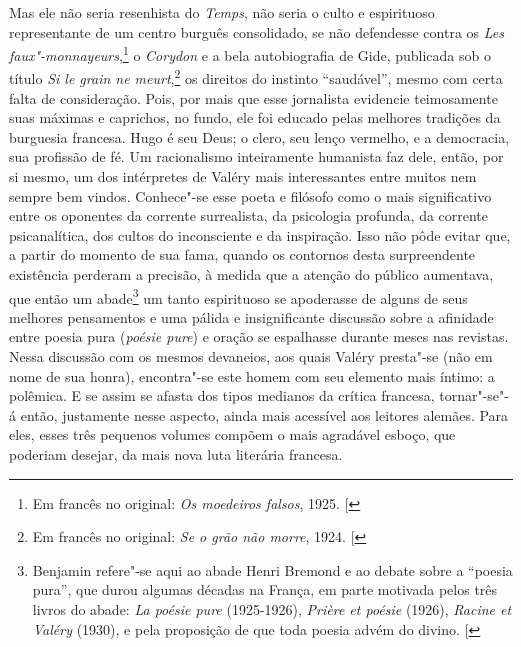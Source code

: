 Mas ele não seria resenhista do \emph{Temps}, não seria o culto e
espirituoso representante de um centro burguês consolidado, se não
defendesse contra os \emph{Les faux"-monnayeurs},\footnote{Em francês no original: \emph{Os moedeiros falsos}, 1925. {[}\versal{N. T.}{]}} o \emph{Corydon} e a bela
autobiografia de Gide, publicada sob o título \emph{Si le grain ne meurt},\footnote{Em francês no original: \emph{Se o grão não
morre}, 1924. {[}\versal{N. T.}{]}} os direitos do instinto ``saudável'', mesmo com certa falta de
consideração. Pois, por mais que esse jornalista evidencie teimosamente
suas máximas e caprichos, no fundo, ele foi educado pelas melhores
tradições da burguesia francesa. Hugo é seu Deus; o clero, seu lenço
vermelho, e a democracia, sua profissão de fé. Um racionalismo
inteiramente humanista faz dele, então, por si mesmo, um dos intérpretes
de Valéry mais interessantes entre muitos nem sempre bem vindos.
Conhece"-se esse poeta e filósofo como o mais significativo entre os
oponentes da corrente surrealista, da psicologia profunda, da corrente
psicanalítica, dos cultos do inconsciente e da inspiração. Isso não pôde
evitar que, a partir do momento de sua fama, quando os contornos desta
surpreendente existência perderam a precisão, à medida que a atenção do
público aumentava, que então um abade\footnote{Benjamin refere"-se aqui
  ao abade Henri Bremond e ao debate sobre a ``poesia pura'', que durou
  algumas décadas na França, em parte motivada pelos três livros do
  abade: \emph{La poésie pure} (1925-1926), \emph{Prière et poésie}
  (1926), \emph{Racine et Valéry} (1930), e pela proposição de que toda
  poesia advém do divino. {[}\versal{N. E.}{]}} um tanto espirituoso se
apoderasse de alguns de seus melhores pensamentos e uma pálida e
insignificante discussão sobre a afinidade entre poesia pura
(\emph{poésie pure}) e oração se espalhasse durante meses nas revistas.
Nessa discussão com os mesmos devaneios, aos quais Valéry presta"-se (não
em nome de sua honra), encontra"-se este homem com seu elemento mais íntimo: a
polêmica. E se assim se afasta dos tipos medianos da crítica francesa,
tornar"-se"-á então, justamente nesse aspecto, ainda mais acessível aos
leitores alemães. Para eles, esses três pequenos volumes compõem o mais
agradável esboço, que poderiam desejar, da mais nova luta literária
francesa.
